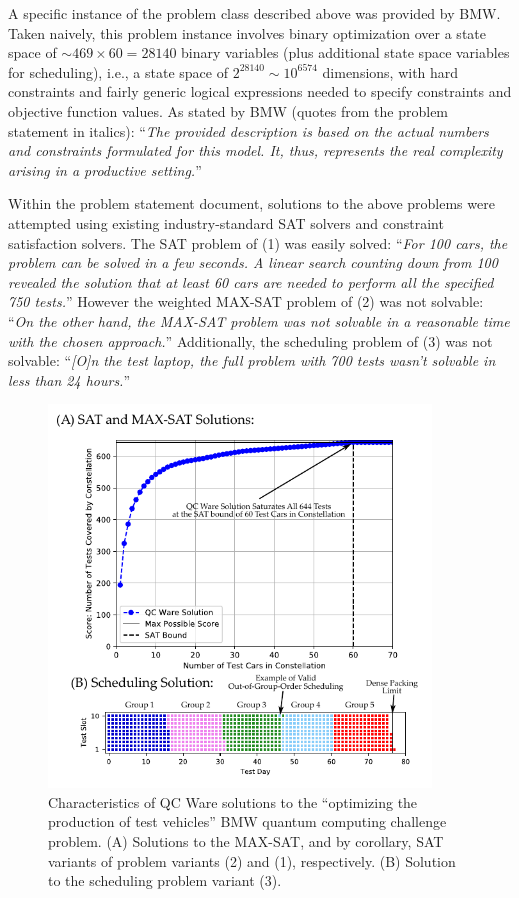 \documentclass[aps,pra,twocolumn,superscriptaddress,groupedaddress]{revtex4}  %
\begin{document}
A specific instance of the problem class described above was provided by BMW.
Taken naively, this problem instance involves binary optimization over a state
space of $\sim 469\times60 = 28140$ binary variables (plus additional state
space variables for scheduling), i.e., a state space of $2^{28140} \sim
10^{6574}$ dimensions, with hard constraints and fairly generic logical
expressions needed to specify constraints and objective function values.  As
stated by BMW (quotes from the problem statement in italics): ``\textit{The
provided description is based on the actual numbers and constraints formulated
for this model. It, thus, represents the real complexity arising in a productive
setting.}''

Within the problem statement document, solutions to the above problems were
attempted using existing industry-standard SAT solvers and constraint
satisfaction solvers. The SAT problem of (1) was easily solved:
``\textit{For 100 cars, the problem can be solved in a few seconds. A linear search counting down
from 100 revealed the solution that at least 60 cars are needed to perform all the specified
750 tests.}''
However the weighted MAX-SAT problem of (2) was not solvable:
``\textit{On the other hand, the MAX-SAT problem was not solvable in a reasonable time with the
chosen approach.}''
Additionally, the scheduling problem of (3) was not solvable:
``\textit{[O]n the test laptop, the full problem with 700 tests wasn't solvable in less than 24
hours.}''

\begin{figure}[ht]
\begin{center}
\includegraphics[width=4in]{figures/solution.pdf}
\caption{Characteristics of QC Ware solutions to the ``optimizing the production
of test vehicles'' BMW quantum computing challenge problem. (A) Solutions
to the MAX-SAT, and by corollary, SAT variants of problem variants (2) and (1),
respectively. (B) Solution to the scheduling problem variant (3).}
\label{fig:solution}
\end{center}
\end{figure}
\end{document}
